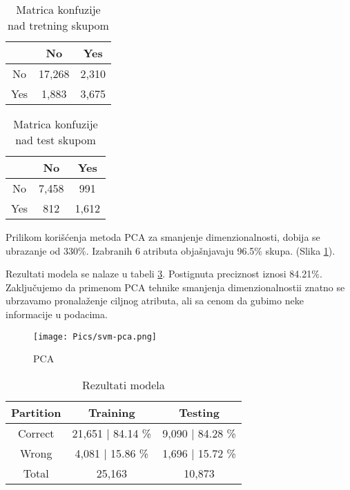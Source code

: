 \documentclass[a4paper]{article}
\begin{document}
\begin{table}[H]
        \begin{center}
        \caption{Matrica konfuzije nad tretning skupom}
        \label{tab:SVM-CM-train}
        \begin{tabular}{|c|c|c|} \hline
        \textbf{} & \textbf{No} & \textbf{Yes} \\ \hline
        No & 17,268 & 2,310  \\ \hline
        Yes & 1,883 & 3,675 \\ \hline
        \end{tabular}
        \end{center}
\end{table}
\begin{table}[H]
        \begin{center}
        \caption{Matrica konfuzije nad test skupom}
        \label{tab:SVM-CM-test}
        \begin{tabular}{|c|c|c|} \hline
        \textbf{} & \textbf{No} & \textbf{Yes} \\ \hline
        No & 7,458 & 991  \\ \hline
        Yes &  812 & 1,612 \\ \hline
        \end{tabular}
        \end{center}
\end{table}
Prilikom korišćenja metoda PCA za smanjenje dimenzionalnosti, dobija se ubrazanje od 330\%. Izabranih 6 atributa objašnjavaju 96.5\% skupa. (Slika \ref{fig:svm-pca}). \par
Rezultati modela se nalaze u tabeli \ref{tab:PCA-res}. Postignuta preciznost iznosi 84.21\%. Zaključujemo da primenom PCA tehnike smanjenja dimenzionalnostii znatno se ubrzavamo pronalaženje ciljnog atributa, ali sa cenom da gubimo neke informacije u podacima.

\begin{figure}[H]
     \centering
     \texttt{[image: Pics/svm-pca.png]}
     \caption{PCA}
     \label{fig:svm-pca}
\end{figure}

\begin{table}[H]
        \begin{center}
        \caption{Rezultati modela}
        \label{tab:PCA-res}
        \begin{tabular}{|c|c|c|} \hline
        \textbf{Partition} & \textbf{Training} & \textbf{Testing}\\ \hline
        Correct & 21,651 | 84.14 \% & 9,090 | 84.28 \% \\ \hline
        Wrong    & 4,081 | 15.86 \% & 1,696 | 15.72 \% \\ \hline
        Total & 25,163  & 10,873 \\ \hline
        \end{tabular}
        \end{center}
\end{table}
\end{document}
